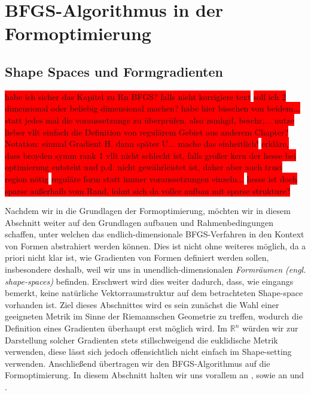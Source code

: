 
\section{BFGS-Algorithmus in der Formoptimierung}\label{Chap_3}
\subsection{Shape Spaces und Formgradienten}
\label{Chap_shapespaces}

\colorbox{red}{habe ich sicher das Kapitel zu Rn BFGS? falls nicht korrigiere text}  \newline
\colorbox{red}{soll ich 2 dimensional oder beliebig dimensional machen? habe hier bisschen von beidem...} \newline
\colorbox{red}{ statt jedes mal die voraussetzunge zu überprüfen, also zsmhgd, beschr,... nutze lieber vllt einfach die Definition von regulärem Gebiet aus anderem Chapter?} \newline
\colorbox{red}{Notation: einmal Gradient H, dann später U... mache das einheitlich!} \newline
\colorbox{red}{erkläre, dass broyden symm rank 1 vllt nicht schlecht ist, falls großer kern der hesse bei optimierung entsteht und p.d. nicht gewährleistet ist,
daher aber auch trust region nötig} \newline
\colorbox{red}{reguläre form statt immer voraussetzungen einzeln...} \newline
\colorbox{red}{hesse ist doch sparse außerhalb vom Rand, lohnt sich da voller aufbau mit sparse strukture?} \newline

Nachdem wir in die Grundlagen der Formoptimierung, möchten wir in diesem Abschnitt weiter auf den Grundlagen aufbauen und Rahmenbedingungen schaffen, unter welchen das endlich-dimensionale BFGS-Verfahren in den Kontext von Formen abstrahiert werden können. Dies ist nicht ohne weiteres möglich, da a priori nicht klar ist, wie Gradienten von Formen definiert werden sollen, insbesondere deshalb, weil wir uns in unendlich-dimensionalen \textit{Formräumen (engl. shape-spaces)} befinden. Erschwert wird dies weiter dadurch, dass, wie eingangs bemerkt, keine natürliche Vektorraumstruktur auf dem betrachteten Shape-space vorhanden ist. Ziel dieses Abschnittes wird es sein zunächst die Wahl einer geeigneten Metrik im Sinne der Riemannschen Geometrie zu treffen, wodurch die Definition eines Gradienten überhaupt erst möglich wird. Im $\mathbb{R}^n$ würden wir zur Darstellung solcher Gradienten stets stillschweigend die euklidische Metrik verwenden, diese lässt sich jedoch offensichtlich nicht einfach im Shape-setting verwenden. Anschließend übertragen wir den BFGS-Algorithmus auf die Formoptimierung. In diesem Abschnitt halten wir uns vorallem an \cite{bfgs2}, sowie an \cite{shape_space} und \cite{bfgs1}.


